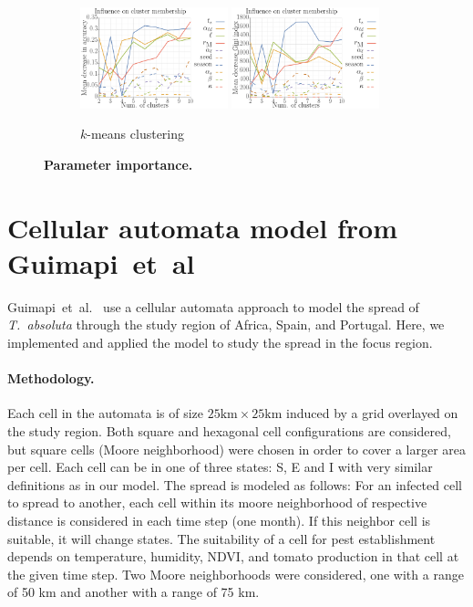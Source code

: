 \documentclass[10pt]{article}
\newcommand{\aacomment}[1]{({\color{magenta}AA: #1})}
\theoremstyle{definition}
\newcommand{\tuta}{\emph{T.~absoluta}}
\begin{document}
\begin{figure}[t]
\begin{subfigure}[b]{\textwidth}
    \includegraphics[width=0.47\textwidth]{../clustering/results/kmeans/rf_k_kmeans_mse.pdf}
    \includegraphics[width=0.47\textwidth]{../clustering/results/kmeans/rf_k_kmeans_mdg.pdf}
    \caption{$k$-means clustering\label{fig:rfA}}
\end{subfigure}
\caption{\textbf{Parameter importance.}\label{fig:rf}}
\end{figure}
\section{Cellular automata model from Guimapi~et~al}
\label{sec:guimapi}
Guimapi~et~al.~\cite{guimapi2016modeling} use a cellular automata approach
to model the spread of \tuta{} through the study region of Africa, Spain, and Portugal. 
Here, we implemented and applied the model to study the spread in the focus
region.
\paragraph{Methodology.}
Each cell in the automata is of size $25\mathrm{km}\times25\mathrm{km}$ induced by a
grid overlayed on the study region. Both square and hexagonal cell
configurations are considered, but square cells (Moore neighborhood) were
chosen in order to cover a larger area per cell.
Each cell can be in one of three states: S, E and I with very similar
definitions as in our model.
The spread is modeled as follows:
For an infected cell to spread to another, each cell within its moore
neighborhood of respective distance is considered in each time step (one month). If this neighbor cell is
suitable, it will change states. The suitability of a cell for pest
establishment depends on temperature, humidity, NDVI, and tomato production
in that cell at the given time step.
Two Moore neighborhoods were
considered, one with a range of 50 km and another with a range of 75 km.
\end{document}
